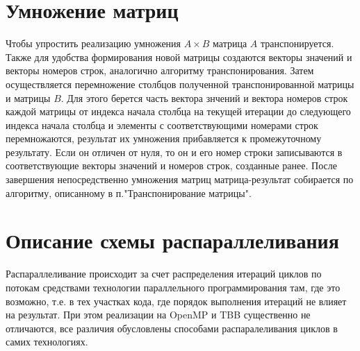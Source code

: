 \documentclass{report}
\begin{document}
\section*{Умножение матриц}
\par Чтобы упростить реализацию умножения \(A×B\) матрица \(A\) транспонируется. Также для удобства формирования новой матрицы создаются векторы значений и векторы номеров строк, аналогично алгоритму транспонирования. Затем осуществляется перемножение столбцов полученной транспонированной матрицы и матрицы \(B\). Для этого берется часть вектора знчений и вектора номеров строк каждой матрицы от индекса начала столбца на текущей итерации до следующего индекса начала столбца и элементы с соответствующими номерами строк перемножаются, результат их умножения прибавляется к промежуточному результату. Если он отличен от нуля, то он и его номер строки записываются в соответствующие векторы значений и номеров строк, созданные ранее. После завершения непосредственно умножения матриц матрица-результат собирается по алгоритму, описанному в п."Транспонирование матрицы".

\newpage

\section*{Описание схемы распараллеливания}
\par Распараллеливание происходит за счет распределения итераций циклов по потокам средствами технологии параллельного программирования там, где это возможно, т.е. в тех участках кода, где порядок выполнения итераций не влияет на результат. При этом реализации на OpenMP и TBB существенно не отличаются, все различия обусловлены способами распаралеливания циклов в самих технологиях.

\newpage

\end{document}
